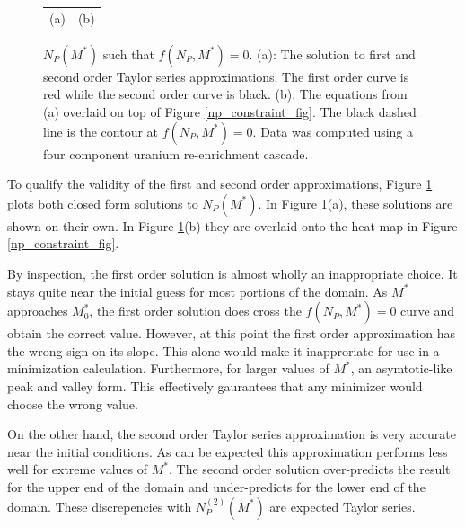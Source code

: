 \documentclass{ansconf}
\begin{document}
\begin{figure}[htpb]
\begin{center}
\begin{tabular}{cc}
(a) & (b) \\
\end{tabular}
\caption{$N_P(M^*)$ such that $f(N_P,M^*)=0$.  (a): The solution to first and 
second order Taylor series approximations.  The first order curve is red while the 
second order curve is black. (b): The equations from (a) overlaid on top of Figure 
\ref{np_constraint_fig}.  The black dashed line is the contour at $f(N_P, M^*)=0$. 
Data was computed using a four component uranium re-enrichment cascade.}
\label{np_closed_fig}
\end{center}
\end{figure}

To qualify the validity of the first and second order approximations, 
Figure \ref{np_closed_fig} plots both closed form solutions to $N_P(M^*)$.
In Figure \ref{np_closed_fig}(a), these solutions are shown on their own.
In Figure \ref{np_closed_fig}(b) they are overlaid onto the heat map in 
Figure \ref{np_constraint_fig}.  

By inspection, the first order solution is almost wholly an inappropriate choice.
It stays quite near the initial guess for most portions of the domain.  As $M^*$
approaches $M_0^*$, the first order solution does cross the $f(N_P, M^*)=0$ curve 
and obtain the correct value.  However, at this point the first order approximation 
has the wrong sign on its slope.  This alone would make it inapproriate for 
use in a minimization calculation.  Furthermore, for larger values of $M^*$, an 
asymtotic-like peak and valley form.  This effectively gaurantees that any minimizer
would choose the wrong value.

On the other hand, the second order Taylor series approximation is very
accurate near the initial conditions.  As can be expected this approximation performs
less well for extreme values of $M^*$.  The second order solution over-predicts the 
result for the upper end of the domain and under-predicts for the lower end of the 
domain.  These discrepencies with $N_P^{(2)}(M^*)$ are expected Taylor series.
\end{document}
